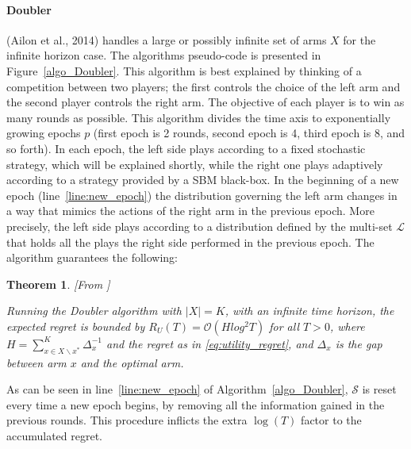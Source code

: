 \documentclass[MSc,beforeExam]{iitcsthesis}
\newtheorem{theorem}{Theorem}
\begin{document}
	\paragraph{Doubler}
	(Ailon et al., 2014) handles a large or possibly infinite set of arms $X$ for the infinite horizon case.
	The algorithms pseudo-code is presented in Figure~\ref{algo_Doubler}.
	This algorithm is best explained by thinking of a competition between two players; the first controls the choice of the left arm and the second player controls the right arm.
	The objective of each player is to win as many rounds as possible.
	This algorithm divides the time axis to exponentially growing epochs $p$ (first epoch is 2 rounds, second epoch is 4, third epoch is 8, and so forth).
	In each epoch, the left side plays according to a fixed stochastic strategy, which will be explained shortly, while the right one plays adaptively according to a strategy provided by a SBM black-box.
	In the beginning of a new epoch (line~\ref{line:new_epoch}) the distribution governing the left arm changes in a way that mimics the actions of the right arm in the previous epoch.
	More precisely, the left side plays according to a distribution defined by the multi-set $\mathcal{L}$ that holds all the plays the right side performed in the previous epoch.
	The algorithm guarantees the following:
	\begin{theorem}\label{thm:Doubler}[From \cite{ailon2014reducing}]

		Running the Doubler algorithm with $|X|=K$, with an infinite time horizon, the expected regret is bounded by $R_U(T) = \mathcal{O} \left(H log^2 T \right)$ for all $T>0$, where $H=\sum_{x\in X \backslash x^*}^K \Delta^{-1}_x$ and the regret as in \eqref{eq:utility_regret}, and $\Delta_x$ is the gap between arm $x$ and the optimal arm.

	\end{theorem}
	As can be seen in line~\ref{line:new_epoch} of Algorithm~\ref{algo_Doubler}, $\mathcal{S}$ is reset every time a new epoch begins, by removing all the information gained in the previous rounds. This procedure inflicts the extra $\log(T)$ factor to the accumulated regret.
	
\end{document}
